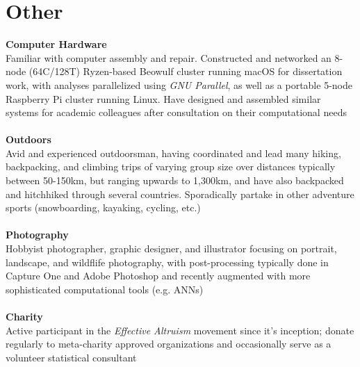\documentclass[12pt]{article}
\begin{document}
\section{Other}
\textbf{Computer Hardware}\\ Familiar with computer assembly and repair. Constructed and networked an 8-node (64C/128T) Ryzen-based Beowulf cluster running macOS for dissertation work, with analyses parallelized using \emph{GNU Parallel}, as well as a portable 5-node Raspberry Pi cluster running Linux. Have designed and assembled similar systems for academic colleagues after consultation on their computational needs\\\\
\textbf{Outdoors}\\ Avid and experienced outdoorsman, having coordinated and lead many hiking, backpacking, and climbing trips of varying group size over distances typically between 50-150km, but ranging upwards to 1,300km, and have also backpacked and hitchhiked through several countries. Sporadically partake in other adventure sports (snowboarding, kayaking, cycling, etc.) \\\\
\textbf{Photography}\\ Hobbyist photographer, graphic designer, and illustrator focusing on portrait, landscape, and wildflife photography, with post-processing typically done in Capture One and Adobe Photoshop and recently augmented with more sophisticated computational tools (e.g. ANNs)\\\\
\textbf{Charity}\\ Active participant in the \emph{Effective Altruism} movement since it's inception; donate regularly to meta-charity approved organizations and occasionally serve as a volunteer statistical consultant

\end{document}
